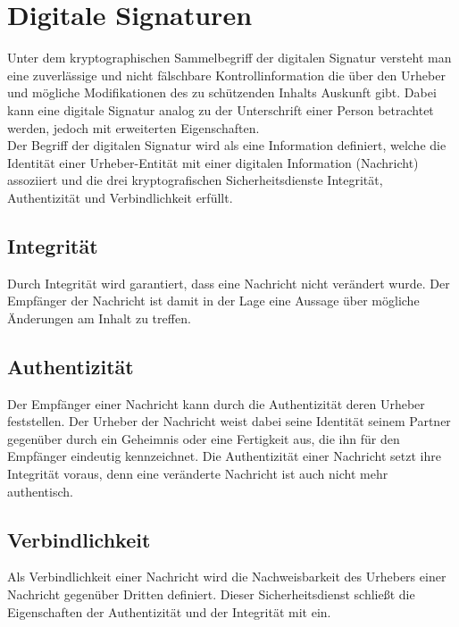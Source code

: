 \section{Digitale Signaturen}
\label{sec:GrundlagenDefinitionen:DigitaleSignaturen}
Unter dem kryptographischen Sammelbegriff der digitalen Signatur versteht man eine zuverlässige und nicht fälschbare Kontrollinformation die über den Urheber
und mögliche Modifikationen des zu schützenden Inhalts Auskunft gibt\cite{kits}. Dabei kann eine digitale Signatur analog zu der Unterschrift einer Person
betrachtet werden\cite{esig:bsi}, jedoch mit erweiterten Eigenschaften.\\
Der Begriff der digitalen Signatur wird als eine Information definiert, welche die Identität einer Urheber-Entität mit einer digitalen Information (Nachricht)
assoziiert und die drei kryptografischen Sicherheitsdienste Integrität, Authentizität und Verbindlichkeit erfüllt\cite{hac}.

\subsection{Integrität}
\label{sec:GrundlagenDefinitionen:DigitaleSignaturen:Integrität}
Durch Integrität wird garantiert, dass eine Nachricht nicht verändert wurde\cite{niag}. Der Empfänger der Nachricht ist damit in der Lage eine Aussage über
mögliche Änderungen am Inhalt zu treffen.

\subsection{Authentizität}
\label{sec:GrundlagenDefinitionen:DigitaleSignaturen:Authentizität}
Der Empfänger einer Nachricht kann durch die Authentizität deren Urheber feststellen. Der Urheber der Nachricht weist dabei seine Identität seinem
Partner gegenüber durch ein Geheimnis oder eine Fertigkeit aus, die ihn für den Empfänger eindeutig kennzeichnet. Die Authentizität einer Nachricht setzt ihre
Integrität voraus, denn eine veränderte Nachricht ist auch nicht mehr authentisch\cite{kits}.

\subsection{Verbindlichkeit}
\label{sec:GrundlagenDefinitionen:DigitaleSignaturen:Verbindlichkeit}
Als Verbindlichkeit einer Nachricht wird die Nachweisbarkeit des Urhebers einer Nachricht gegenüber Dritten definiert. Dieser Sicherheitsdienst schließt die
Eigenschaften der Authentizität und der Integrität mit ein\cite{kits}.

